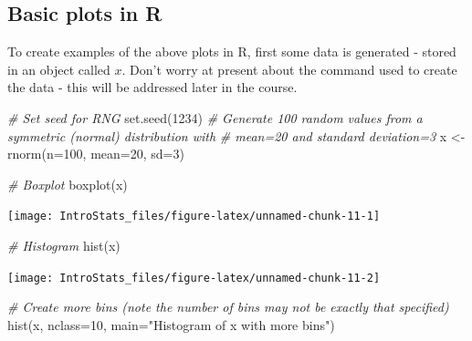 \documentclass[
  oneside]{krantz}
\newenvironment{Shaded}{\begin{snugshade}}{\end{snugshade}}
\newcommand{\AttributeTok}[1]{\textcolor[rgb]{0.77,0.63,0.00}{#1}}
\newcommand{\CommentTok}[1]{\textcolor[rgb]{0.56,0.35,0.01}{\textit{#1}}}
\newcommand{\DecValTok}[1]{\textcolor[rgb]{0.00,0.00,0.81}{#1}}
\newcommand{\FunctionTok}[1]{\textcolor[rgb]{0.00,0.00,0.00}{#1}}
\newcommand{\NormalTok}[1]{#1}
\newcommand{\OtherTok}[1]{\textcolor[rgb]{0.56,0.35,0.01}{#1}}
\newcommand{\StringTok}[1]{\textcolor[rgb]{0.31,0.60,0.02}{#1}}
\begin{document}
\hypertarget{basic-plots-in-r}{%
\subsection{Basic plots in R}\label{basic-plots-in-r}}

To create examples of the above plots in R, first some data is generated - stored in an object called \(x\). Don't worry at present about the command used to create the data - this will be addressed later in the course.

\begin{Shaded}
\begin{Highlighting}[]
\CommentTok{\# Set seed for RNG}
\FunctionTok{set.seed}\NormalTok{(}\DecValTok{1234}\NormalTok{)}
\CommentTok{\# Generate 100 random values from a symmetric (normal) distribution with}
\CommentTok{\#   mean=20 and standard deviation=3}
\NormalTok{x }\OtherTok{\textless{}{-}} \FunctionTok{rnorm}\NormalTok{(}\AttributeTok{n=}\DecValTok{100}\NormalTok{, }\AttributeTok{mean=}\DecValTok{20}\NormalTok{, }\AttributeTok{sd=}\DecValTok{3}\NormalTok{)}

\CommentTok{\# Boxplot}
\FunctionTok{boxplot}\NormalTok{(x)}
\end{Highlighting}
\end{Shaded}

\begin{center}\texttt{[image: IntroStats\_files/figure-latex/unnamed-chunk-11-1]} \end{center}

\begin{Shaded}
\begin{Highlighting}[]
\CommentTok{\# Histogram}
\FunctionTok{hist}\NormalTok{(x)}
\end{Highlighting}
\end{Shaded}

\begin{center}\texttt{[image: IntroStats\_files/figure-latex/unnamed-chunk-11-2]} \end{center}

\begin{Shaded}
\begin{Highlighting}[]
\CommentTok{\# Create more bins (note the number of bins may not be exactly that specified)}
\FunctionTok{hist}\NormalTok{(x, }\AttributeTok{nclass=}\DecValTok{10}\NormalTok{, }\AttributeTok{main=}\StringTok{"Histogram of x with more bins"}\NormalTok{)}
\end{Highlighting}
\end{Shaded}
\end{document}

